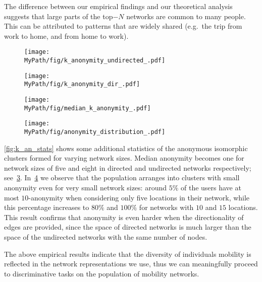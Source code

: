 The difference between our empirical findings and our theoretical analysis suggests that large parts of the top$-N$ networks are common to many people.
This can be attributed to patterns that are widely shared (e.g.\ the trip from work to home, and from home to work).

\begin{figure*}[!t]
	\begin{subfigure}[t]{0.49\textwidth}
		\centering
		\texttt{[image: \\MyPath/fig/k\_anonymity\_undirected\_.pdf]}
		\caption{}
		\label{fig:k_an_un}
	\end{subfigure}%
	\begin{subfigure}[t]{0.49\textwidth}
		\centering
		\texttt{[image: \\MyPath/fig/k\_anonymity\_dir\_.pdf]}
		\caption{}
		\label{fig:k_an_dir}
	\end{subfigure}%
	\caption{{Identifiability set and $k-$anonymity for undirected and directed top$-N$ mobility networks for increasing number of nodes. Displayed is also the theoretical upper bound of identifiability for networks with $ N $ nodes.}
	}
	\label{fig:k_an}
\end{figure*}

\begin{figure*}[!t]
	\begin{subfigure}[t]{0.49\textwidth}
		\centering
		\texttt{[image: \\MyPath/fig/median\_k\_anonymity\_.pdf]}
		\caption{}
		\label{fig:k_an_med}
	\end{subfigure}
	\begin{subfigure}[t]{0.49\textwidth}
		\centering
		\texttt{[image: \\MyPath/fig/anonymity\_distribution\_.pdf]}
		\caption{}
		\label{fig:anon_distribution}
	\end{subfigure}
	\caption{{Anonymity size statistics over the population of top$-N$ mobility networks for increasing network size.}}
	\label{fig:k_an_stats}
\end{figure*}

 \cref{fig:k_an_stats} shows some additional statistics of the anonymous isomorphic clusters formed for varying network sizes.
 Median anonymity becomes one for network sizes of five and eight in directed and undirected networks respectively; see~\cref{fig:k_an_med}.
 In~\cref{fig:anon_distribution} we observe that the population arranges into clusters with small anonymity even for very small network sizes: around $5\%$  of the users have at most $10$-anonymity when considering only five locations in their network, while this percentage increases to $80\%$ and $100\% $ for networks with $10$ and $15$ locations.
 This result confirms that anonymity is even harder when the directionality of edges are provided, since the space of directed networks is much larger than the space of the undirected networks with the same number of nodes.

 The above empirical results indicate that the diversity of individuals mobility is reflected in the network representations we use, thus we can meaningfully proceed to discriminative tasks on the population of mobility networks.